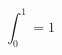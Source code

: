 \documentclass{article}
\begin{document}
\begin{equation} \int_0^1 = 1 \end{equation}
\end{document}
